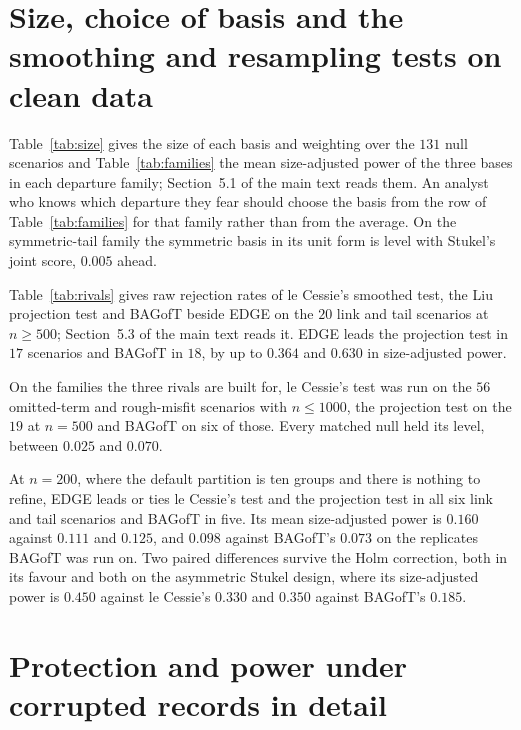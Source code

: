 \documentclass[11pt]{article}
\begin{document}
\section{Size, choice of basis and the smoothing and resampling tests on clean data}\label{si:size}

Table~\ref{tab:size} gives the size of each basis and weighting over the $131$ null scenarios and
Table~\ref{tab:families} the mean size-adjusted power of the three bases in each departure family;
Section~5.1 of the main text reads them. An analyst who knows which departure they fear should choose
the basis from the row of Table~\ref{tab:families} for that family rather than from the average. On
the symmetric-tail family the symmetric basis in its unit form is level with Stukel's joint score,
$0.005$ ahead.





Table~\ref{tab:rivals} gives raw rejection rates of le Cessie's smoothed test, the Liu projection test
and BAGofT beside EDGE on the $20$ link and tail scenarios at $n\ge500$; Section~5.3 of the main text
reads it. EDGE leads the projection test in $17$ scenarios and BAGofT in $18$, by up to $0.364$ and
$0.630$ in size-adjusted power.



On the families the three rivals are built for, le Cessie's test was run on the $56$ omitted-term and
rough-misfit scenarios with $n\le1000$, the projection test on the $19$ at $n=500$ and BAGofT on six
of those. Every matched null held its level, between $0.025$ and $0.070$.

At $n=200$, where the default partition is ten groups and there is nothing to refine, EDGE leads or
ties le Cessie's test and the projection test in all six link and tail scenarios and BAGofT in five.
Its mean size-adjusted power is $0.160$ against $0.111$ and $0.125$, and $0.098$ against BAGofT's
$0.073$ on the replicates BAGofT was run on. Two paired differences survive the Holm correction, both
in its favour and both on the asymmetric Stukel design, where its size-adjusted power is $0.450$
against le Cessie's $0.330$ and $0.350$ against BAGofT's $0.185$.

\section{Protection and power under corrupted records in detail}\label{si:corrdetail}
\end{document}
